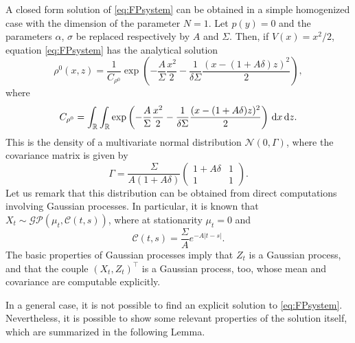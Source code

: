 \documentclass[10pt]{article}
\begin{document}
\begin{example}\label{ex:OrnUhl} A closed form solution of \eqref{eq:FPsystem} can be obtained in a simple homogenized case with the dimension of the parameter $N=1$. Let $p(y) = 0$ and the parameters $\alpha$, $\sigma$ be replaced respectively by $A$ and $\Sigma$. Then, if $V(x) = x^2/2$, equation \eqref{eq:FPsystem} has the analytical solution 
\begin{equation}
\rho^0(x,z) = \frac{1}{C_{\rho^0}} \exp\left(-\frac{A}{\Sigma} \frac{x^2}{2} - \frac{1}{\delta \Sigma} \frac{(x - (1+A \delta)z)^2}{2}\right),
\end{equation}
where
\begin{equation}
C_{\rho^0} = \int_{\mathbb{R}} \int_{\mathbb{R}} \exp\left(-\frac{A}{\Sigma} \frac{x^2}{2} - \frac{1}{\delta \Sigma} \frac{(x - (1+A \delta)z)^2}{2}\right) \,\mathrm{d} x \,\mathrm{d} z.
\end{equation}
This is the density of a multivariate normal distribution $\mathcal N(0, \Gamma)$, where the covariance matrix is given by
\begin{equation}
\Gamma = \frac{\Sigma}{A (1 + A\delta)} \begin{pmatrix} 1+A\delta & 1 \\ 1 & 1 \end{pmatrix}.
\end{equation}
Let us remark that this distribution can be obtained from direct computations involving Gaussian processes. In particular, it is known that $X_t \sim \mathcal{GP}(\mu_t, \mathcal C(t, s))$, where at stationarity $\mu_t = 0$ and
\begin{equation}
	\mathcal C(t, s) = \frac{\Sigma}{A} e^{-A|t-s|}.
\end{equation}
The basic properties of Gaussian processes imply that $Z_t$ is a Gaussian process, and that the couple $(X_t, Z_t)^\top$ is a Gaussian process, too, whose mean and covariance are computable explicitly.
\end{example}

In a general case, it is not possible to find an explicit solution to \eqref{eq:FPsystem}. Nevertheless, it is possible to show some relevant properties of the solution itself, which are summarized in the following Lemma.
\end{document}
